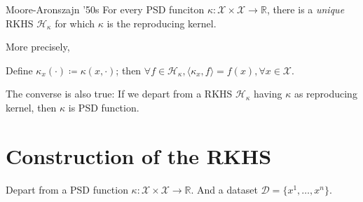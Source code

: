 \begin{theorem}[parbox=false]{Moore-Aronszajn '50s}{}
	For every PSD funciton $\kappa: \mathcal{X} \times \mathcal{X} \to \mathds{R}$, there
	is a \emph{unique} RKHS $\mathcal{H}_\kappa$ for which $\kappa$ is the reproducing kernel.

	\tcblower

	More precisely,

	Define $\kappa_x(\cdot) \coloneqq \kappa(x, \cdot)$; then
	$\forall f \in \mathcal{H}_\kappa,
		\langle \kappa_x, f \rangle = f(x), \forall x \in \mathcal{X}$.

    \begin{note}The converse is also true:
	If we depart from a RKHS $\mathcal{H}_{\kappa}$ having
	$\kappa$ as reproducing kernel, then $\kappa$ is PSD function.
\end{note}
\end{theorem}

\section{Construction of the RKHS}

Depart from a PSD function $\kappa: \mathcal{X} \times \mathcal{X} \to \mathds{R}$.
And a dataset $\mathcal{D} = \{x^1, \dots, x^n\}$.

